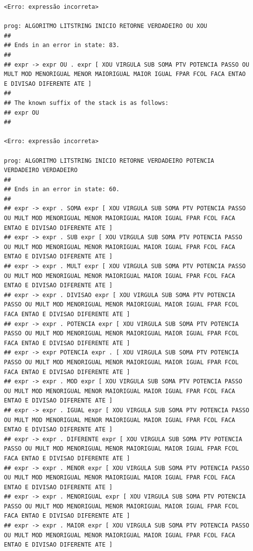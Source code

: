 \documentclass[hidelinks,12pt]{article}
\begin{document}
\begin{lstlisting}
<Erro: expressão incorreta>

prog: ALGORITMO LITSTRING INICIO RETORNE VERDADEIRO OU XOU 
##
## Ends in an error in state: 83.
##
## expr -> expr OU . expr [ XOU VIRGULA SUB SOMA PTV POTENCIA PASSO OU MULT MOD MENORIGUAL MENOR MAIORIGUAL MAIOR IGUAL FPAR FCOL FACA ENTAO E DIVISAO DIFERENTE ATE ]
##
## The known suffix of the stack is as follows:
## expr OU 
##

<Erro: expressão incorreta>

prog: ALGORITMO LITSTRING INICIO RETORNE VERDADEIRO POTENCIA VERDADEIRO VERDADEIRO 
##
## Ends in an error in state: 60.
##
## expr -> expr . SOMA expr [ XOU VIRGULA SUB SOMA PTV POTENCIA PASSO OU MULT MOD MENORIGUAL MENOR MAIORIGUAL MAIOR IGUAL FPAR FCOL FACA ENTAO E DIVISAO DIFERENTE ATE ]
## expr -> expr . SUB expr [ XOU VIRGULA SUB SOMA PTV POTENCIA PASSO OU MULT MOD MENORIGUAL MENOR MAIORIGUAL MAIOR IGUAL FPAR FCOL FACA ENTAO E DIVISAO DIFERENTE ATE ]
## expr -> expr . MULT expr [ XOU VIRGULA SUB SOMA PTV POTENCIA PASSO OU MULT MOD MENORIGUAL MENOR MAIORIGUAL MAIOR IGUAL FPAR FCOL FACA ENTAO E DIVISAO DIFERENTE ATE ]
## expr -> expr . DIVISAO expr [ XOU VIRGULA SUB SOMA PTV POTENCIA PASSO OU MULT MOD MENORIGUAL MENOR MAIORIGUAL MAIOR IGUAL FPAR FCOL FACA ENTAO E DIVISAO DIFERENTE ATE ]
## expr -> expr . POTENCIA expr [ XOU VIRGULA SUB SOMA PTV POTENCIA PASSO OU MULT MOD MENORIGUAL MENOR MAIORIGUAL MAIOR IGUAL FPAR FCOL FACA ENTAO E DIVISAO DIFERENTE ATE ]
## expr -> expr POTENCIA expr . [ XOU VIRGULA SUB SOMA PTV POTENCIA PASSO OU MULT MOD MENORIGUAL MENOR MAIORIGUAL MAIOR IGUAL FPAR FCOL FACA ENTAO E DIVISAO DIFERENTE ATE ]
## expr -> expr . MOD expr [ XOU VIRGULA SUB SOMA PTV POTENCIA PASSO OU MULT MOD MENORIGUAL MENOR MAIORIGUAL MAIOR IGUAL FPAR FCOL FACA ENTAO E DIVISAO DIFERENTE ATE ]
## expr -> expr . IGUAL expr [ XOU VIRGULA SUB SOMA PTV POTENCIA PASSO OU MULT MOD MENORIGUAL MENOR MAIORIGUAL MAIOR IGUAL FPAR FCOL FACA ENTAO E DIVISAO DIFERENTE ATE ]
## expr -> expr . DIFERENTE expr [ XOU VIRGULA SUB SOMA PTV POTENCIA PASSO OU MULT MOD MENORIGUAL MENOR MAIORIGUAL MAIOR IGUAL FPAR FCOL FACA ENTAO E DIVISAO DIFERENTE ATE ]
## expr -> expr . MENOR expr [ XOU VIRGULA SUB SOMA PTV POTENCIA PASSO OU MULT MOD MENORIGUAL MENOR MAIORIGUAL MAIOR IGUAL FPAR FCOL FACA ENTAO E DIVISAO DIFERENTE ATE ]
## expr -> expr . MENORIGUAL expr [ XOU VIRGULA SUB SOMA PTV POTENCIA PASSO OU MULT MOD MENORIGUAL MENOR MAIORIGUAL MAIOR IGUAL FPAR FCOL FACA ENTAO E DIVISAO DIFERENTE ATE ]
## expr -> expr . MAIOR expr [ XOU VIRGULA SUB SOMA PTV POTENCIA PASSO OU MULT MOD MENORIGUAL MENOR MAIORIGUAL MAIOR IGUAL FPAR FCOL FACA ENTAO E DIVISAO DIFERENTE ATE ]

\end{lstlisting}
\end{document}

